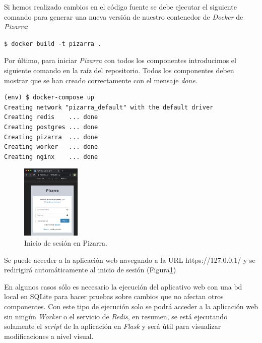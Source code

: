 \documentclass[11pt,spanish,listoffigures,listoftables]{tfgetsinf}
\begin{document}
Si hemos realizado cambios en el código fuente se debe ejecutar el siguiente comando para generar una nueva versión de nuestro \Gls{contenedor} de \textit{Docker} de \textit{Pizarra}: \newline

\begin{lstlisting}[style=ascii-tree]
$ docker build -t pizarra .
\end{lstlisting}

Por último, para iniciar \textit{Pizarra} con todos los componentes introducimos el siguiente comando en la raíz del repositorio. Todos los componentes deben mostrar que se han creado correctamente con el mensaje \textit{done}. \newline

\begin{lstlisting}[style=ascii-tree]
(env) $ docker-compose up
Creating network "pizarra_default" with the default driver
Creating redis    ... done
Creating postgres ... done
Creating pizarra  ... done
Creating worker   ... done
Creating nginx    ... done
\end{lstlisting}

\begin{figure}
	\includegraphics[width=0.25\textwidth]{img/docker-compose-pizarra}
	\caption[Inicio de sesión en Pizarra]{Inicio de sesión en Pizarra.}
	\label{figura:docker-compose-pizarra}
\end{figure}

Se puede acceder a la aplicación web navegando a la URL https://127.0.0.1/ y se redirigirá automáticamente al inicio de sesión (Figura\ref{figura:docker-compose-pizarra})

En algunos casos sólo es necesario la ejecución del aplicativo web con una \acrshort{bd} local en SQLite para hacer pruebas sobre cambios que no afectan otros componentes. Con este tipo de ejecución solo se podrá acceder a la aplicación web sin ningún \textit{Worker} o el servicio de \textit{Redis}, en resumen, se está ejecutando solamente el \textit{script} de la aplicación en \textit{Flask} y será útil para visualizar modificaciones a nivel visual.
\end{document}
